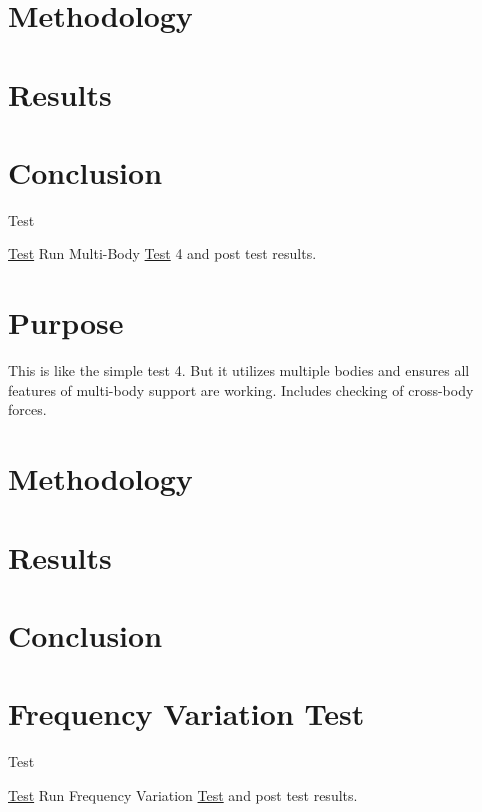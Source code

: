 \section*{Methodology}

\section*{Results}

\section*{Conclusion}

\begin{DoxyRefDesc}{Test}
\item[\hyperlink{test__test000013}{Test}]Run Multi-\/\-Body \hyperlink{class_test}{Test} 4 and post test results.\end{DoxyRefDesc}


\section*{Purpose}

This is like the simple test 4. But it utilizes multiple bodies and ensures all features of multi-\/body support are working. Includes checking of cross-\/body forces.

\section*{Methodology}

\section*{Results}

\section*{Conclusion}\hypertarget{TestFrequency}{}\section{Frequency Variation Test}\label{TestFrequency}
\begin{DoxyRefDesc}{Test}
\item[\hyperlink{test__test000009}{Test}]Run Frequency Variation \hyperlink{class_test}{Test} and post test results.\end{DoxyRefDesc}


